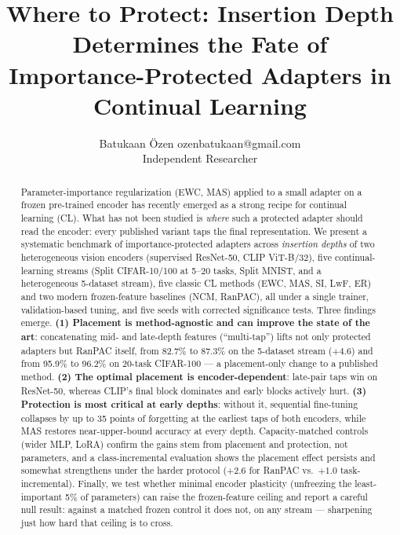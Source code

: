 \documentclass{article} %
\title{Where to Protect: Insertion Depth Determines the Fate of\\
Importance-Protected Adapters in Continual Learning}
\author{\name Batukaan \"Ozen \email ozenbatukaan@gmail.com \\
\addr Independent Researcher}
\begin{document}
\maketitle

\begin{abstract}
Parameter-importance regularization (EWC, MAS) applied to a small adapter on a
frozen pre-trained encoder has recently emerged as a strong recipe for
continual learning (CL). What has not been studied is \emph{where} such a
protected adapter should read the encoder: every published variant taps the
final representation. We present a systematic benchmark of importance-protected
adapters across \emph{insertion depths} of two heterogeneous vision encoders
(supervised ResNet-50, CLIP ViT-B/32), five continual-learning streams
(Split CIFAR-10/100 at 5--20 tasks, Split MNIST, and a heterogeneous
5-dataset stream), five classic CL methods (EWC, MAS, SI, LwF, ER) and two
modern frozen-feature baselines (NCM, RanPAC), all under a single trainer,
validation-based tuning, and five seeds with corrected significance tests.
Three findings emerge. \textbf{(1) Placement is method-agnostic and can improve
the state of the art}: concatenating mid- and late-depth features
(``multi-tap'') lifts not only protected adapters but RanPAC itself, from
82.7\% to 87.3\% on the 5-dataset stream ($+4.6$) and from 95.9\% to 96.2\% on
20-task CIFAR-100 --- a placement-only change to a published method.
\textbf{(2) The optimal placement is encoder-dependent}: late-pair taps win on
ResNet-50, whereas CLIP's final block dominates and early blocks actively hurt.
\textbf{(3) Protection is most critical at early depths}: without it,
sequential fine-tuning collapses by up to 35 points of forgetting at the
earliest taps of both encoders, while MAS restores near-upper-bound accuracy at
every depth. Capacity-matched controls (wider MLP, LoRA) confirm the gains stem
from placement and protection, not parameters, and a class-incremental
evaluation shows the placement effect persists and somewhat strengthens under
the harder protocol ($+2.6$ for RanPAC vs.\ $+1.0$ task-incremental). Finally,
we test whether minimal encoder plasticity (unfreezing the least-important
5\% of parameters) can raise the frozen-feature ceiling and report a careful
null result: against a matched frozen control it does not, on any stream ---
sharpening just how hard that ceiling is to cross.
\end{abstract}
\end{document}
